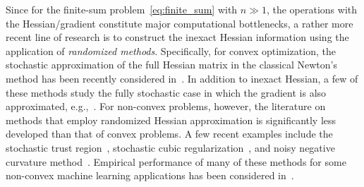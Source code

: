 Since for the finite-sum problem~\eqref{eq:finite_sum} with $ n \gg 1 $, the operations with the Hessian/gradient constitute major computational bottlenecks, a rather more recent line of research is to construct the inexact Hessian information using the application of \emph{randomized methods}. Specifically, for convex optimization, the stochastic approximation of the full Hessian matrix in the classical Newton's method has been recently considered in~\cite{byrd2011use, byrd2012sample, wang2015subsampled,pilanci2015newton, erdogdu2015convergence, romassn1, romassn2, pyrrm_ssn_nonuni, Agarwal2016SecondOS, mutny2016stochastic, ye2016revisiting, bollapragada2016exact, mutny2017parallel, berahas2017investigation,eisen2017large}. In addition to inexact Hessian, a few of these methods study the fully stochastic case in which the gradient is also approximated, e.g.,~\cite{romassn1, romassn2,bollapragada2016exact}. For non-convex problems, however, the literature on methods that employ randomized Hessian approximation is significantly less developed than that of convex problems. A few recent examples include the stochastic trust region~\cite{xu2017newton}, stochastic cubic regularization~\cite{xu2017newton,tripuraneni2017stochastic}, and noisy negative curvature method~\cite{liu2017noisy}. Empirical performance of many of these methods for some non-convex machine learning applications has been considered in~\cite{xu2017second}.

